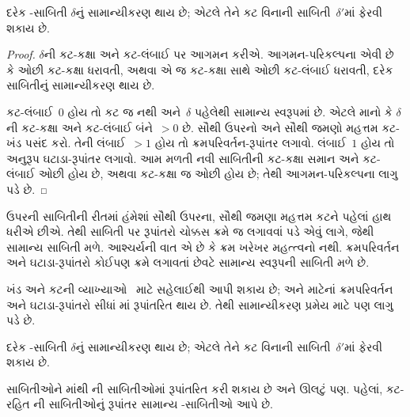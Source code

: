 \begin{thm}
દરેક -સાબિતી
$\delta$નું સામાન્યીકરણ
થાય છે; એટલે તેને
કટ વિનાની
સાબિતી~$\delta'$માં
ફેરવી શકાય છે.
\end{thm}

\begin{proof}
  $\delta$ની કટ-કક્ષા
  અને કટ-લંબાઈ પર
  આગમન કરીએ.
  આગમન-પરિકલ્પના એવી
  છે કે ઓછી કટ-કક્ષા
  ધરાવતી, અથવા એ
  જ કટ-કક્ષા સાથે
  ઓછી કટ-લંબાઈ ધરાવતી,
  દરેક સાબિતીનું
  સામાન્યીકરણ થાય છે.

  કટ-લંબાઈ~$0$
  હોય તો કટ જ
  નથી અને~$\delta$
  પહેલેથી સામાન્ય
  સ્વરૂપમાં છે.
  એટલે માનો કે
  $\delta$ની કટ-કક્ષા
  અને કટ-લંબાઈ
  બંને~$> 0$ છે.
  સૌથી ઉપરનો અને
  સૌથી જમણો મહત્તમ
  કટ-ખંડ પસંદ કરો.
  તેની લંબાઈ~$>1$
  હોય તો
  ક્રમપરિવર્તન-રૂપાંતર
  લગાવો. લંબાઈ~$1$
  હોય તો અનુરૂપ
  ઘટાડા-રૂપાંતર
  લગાવો. આમ મળતી
  નવી સાબિતીની
  કટ-કક્ષા સમાન
  અને કટ-લંબાઈ ઓછી
  હોય છે, અથવા
  કટ-કક્ષા જ ઓછી
  હોય છે; તેથી
  આગમન-પરિકલ્પના
  લાગુ પડે છે.
\end{proof}

ઉપરની સાબિતીની રીતમાં
હંમેશાં સૌથી ઉપરના,
સૌથી જમણા મહત્તમ
કટને પહેલાં હાથ
ધરીએ છીએ. તેથી
સાબિતી પર રૂપાંતરો
ચોક્કસ ક્રમે જ
લગાવવાં પડે એવું
લાગે, જેથી સામાન્ય
સાબિતી મળે.
આશ્ચર્યની વાત એ
છે કે ક્રમ ખરેખર
મહત્ત્વનો નથી.
ક્રમપરિવર્તન અને
ઘટાડા-રૂપાંતરો કોઈપણ
ક્રમે લગાવતાં છેવટે
સામાન્ય સ્વરૂપની
સાબિતી મળે છે.

ખંડ અને કટની
વ્યાખ્યાઓ~
માટે સહેલાઈથી આપી
શકાય છે; અને
 માટેનાં
ક્રમપરિવર્તન અને
ઘટાડા-રૂપાંતરો સીધાં
માં રૂપાંતરિત
થાય છે. તેથી
સામાન્યીકરણ પ્રમેય
 માટે પણ
લાગુ પડે છે.

\begin{thm}
દરેક -સાબિતી
$\delta$નું સામાન્યીકરણ
થાય છે; એટલે તેને
કટ વિનાની
સાબિતી~$\delta'$માં
ફેરવી શકાય છે.
\end{thm}
\endgroup

\begingroup
\makeatletter{}\makeatother


\label{guunit:OLP-0678}


સાબિતીઓને
માંથી
ની
સાબિતીઓમાં
રૂપાંતરિત કરી
શકાય છે અને
ઊલટું પણ.
પહેલાં, કટ-રહિત
ની
સાબિતીઓનું
રૂપાંતર સામાન્ય
-સાબિતીઓ
આપે છે.

